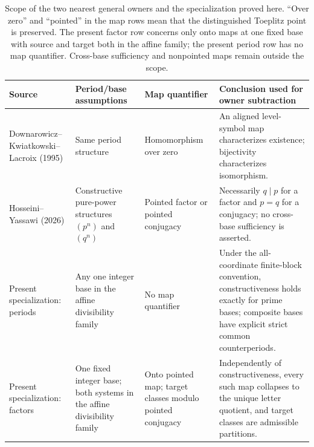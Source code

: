 \begin{table}[t]
\centering
\caption{Scope of the two nearest general owners and the specialization
proved here.  ``Over zero'' and ``pointed'' in the map rows mean that the
distinguished Toeplitz point is preserved.  The present factor row concerns
only onto maps at one fixed base with source and target both in the affine
family; the present period row has no map quantifier.  Cross-base sufficiency
and nonpointed maps remain outside the scope.}
\label{tab:owner-scope}
\small
\begin{tabularx}{\textwidth}{@{}
  >{\raggedright\arraybackslash}p{}
  >{\raggedright\arraybackslash}p{}
  >{\raggedright\arraybackslash}p{}
  >{\raggedright\arraybackslash}X@{}}
\toprule
Source & Period/base assumptions & Map quantifier & Conclusion used for owner subtraction \\
\midrule
Downarowicz--Kwiatkowski--Lacroix (1995)
& Same period structure
& Homomorphism over zero
& An aligned level-symbol map characterizes existence; bijectivity
  characterizes isomorphism. \\
Hosseini--Yassawi (2026)
& Constructive pure-power structures $(p^n)$ and $(q^n)$
& Pointed factor or pointed conjugacy
& Necessarily $q\mid p$ for a factor and $p=q$ for a conjugacy; no
  cross-base sufficiency is asserted. \\
Present specialization: periods
& Any one integer base in the affine divisibility family
& No map quantifier
& Under the all-coordinate finite-block convention, constructiveness holds
  exactly for prime bases; composite bases have explicit strict common
  counterperiods. \\
Present specialization: factors
& One fixed integer base; both systems in the affine divisibility family
& Onto pointed map; target classes modulo pointed conjugacy
& Independently of constructiveness, every such map collapses to the unique
  letter quotient, and target classes are admissible partitions. \\
\bottomrule
\end{tabularx}
\end{table}
